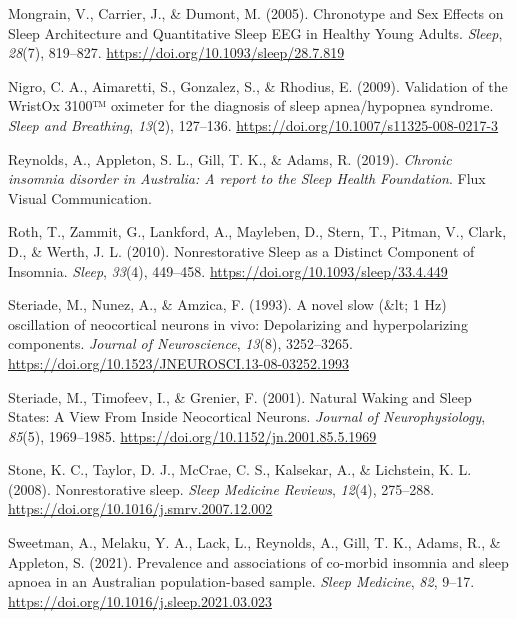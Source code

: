 \documentclass[
]{article}
\newlength{\cslhangindent}
\newenvironment{CSLReferences}[2] %
 {\begin{list}{}{%
  \setlength{\itemindent}{0pt}
  \setlength{\leftmargin}{0pt}
  \setlength{\parsep}{0pt}
  \ifodd #1
   \setlength{\leftmargin}{\cslhangindent}
   \setlength{\itemindent}{-1\cslhangindent}
  \fi
  \setlength{\itemsep}{#2\baselineskip}}}
 {\end{list}}
\begin{document}
\begin{CSLReferences}{1}{0}
Mongrain, V., Carrier, J., \& Dumont, M. (2005). Chronotype and {Sex
Effects} on {Sleep Architecture} and {Quantitative Sleep EEG} in
{Healthy Young Adults}. \emph{Sleep}, \emph{28}(7), 819--827.
\url{https://doi.org/10.1093/sleep/28.7.819}

Nigro, C. A., Aimaretti, S., Gonzalez, S., \& Rhodius, E. (2009).
Validation of the {WristOx} 3100™ oximeter for the diagnosis of sleep
apnea/hypopnea syndrome. \emph{Sleep and Breathing}, \emph{13}(2),
127--136. \url{https://doi.org/10.1007/s11325-008-0217-3}

Reynolds, A., Appleton, S. L., Gill, T. K., \& Adams, R. (2019).
\emph{Chronic insomnia disorder in {Australia}: {A} report to the {Sleep
Health Foundation}}. Flux Visual Communication.

Roth, T., Zammit, G., Lankford, A., Mayleben, D., Stern, T., Pitman, V.,
Clark, D., \& Werth, J. L. (2010). Nonrestorative {Sleep} as a {Distinct
Component} of {Insomnia}. \emph{Sleep}, \emph{33}(4), 449--458.
\url{https://doi.org/10.1093/sleep/33.4.449}

Steriade, M., Nunez, A., \& Amzica, F. (1993). A novel slow (\&lt; 1
{Hz}) oscillation of neocortical neurons in vivo: Depolarizing and
hyperpolarizing components. \emph{Journal of Neuroscience},
\emph{13}(8), 3252--3265.
\url{https://doi.org/10.1523/JNEUROSCI.13-08-03252.1993}

Steriade, M., Timofeev, I., \& Grenier, F. (2001). Natural {Waking} and
{Sleep States}: {A View From Inside Neocortical Neurons}. \emph{Journal
of Neurophysiology}, \emph{85}(5), 1969--1985.
\url{https://doi.org/10.1152/jn.2001.85.5.1969}

Stone, K. C., Taylor, D. J., McCrae, C. S., Kalsekar, A., \& Lichstein,
K. L. (2008). Nonrestorative sleep. \emph{Sleep Medicine Reviews},
\emph{12}(4), 275--288. \url{https://doi.org/10.1016/j.smrv.2007.12.002}

Sweetman, A., Melaku, Y. A., Lack, L., Reynolds, A., Gill, T. K., Adams,
R., \& Appleton, S. (2021). Prevalence and associations of co-morbid
insomnia and sleep apnoea in an {Australian} population-based sample.
\emph{Sleep Medicine}, \emph{82}, 9--17.
\url{https://doi.org/10.1016/j.sleep.2021.03.023}


\end{CSLReferences}
\end{document}
